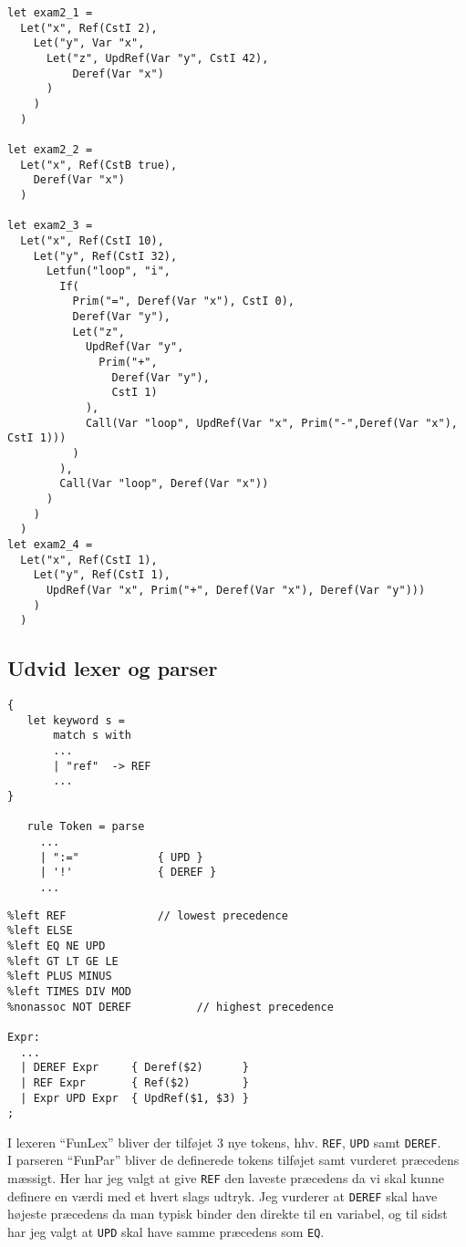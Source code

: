 \documentclass[11pt,a4paper]{article}
\begin{document}
\begin{lstlisting}[style=fsharp]
let exam2_1 = 
  Let("x", Ref(CstI 2),
    Let("y", Var "x",
      Let("z", UpdRef(Var "y", CstI 42),
          Deref(Var "x")
      )
    )
  )

let exam2_2 = 
  Let("x", Ref(CstB true),
    Deref(Var "x")
  )

let exam2_3 = 
  Let("x", Ref(CstI 10),
    Let("y", Ref(CstI 32),
      Letfun("loop", "i",
        If(
          Prim("=", Deref(Var "x"), CstI 0),
          Deref(Var "y"),
          Let("z", 
            UpdRef(Var "y", 
              Prim("+",
                Deref(Var "y"), 
                CstI 1)
            ),
            Call(Var "loop", UpdRef(Var "x", Prim("-",Deref(Var "x"), CstI 1)))
          )
        ),
        Call(Var "loop", Deref(Var "x"))
      )
    )
  )
let exam2_4 = 
  Let("x", Ref(CstI 1),
    Let("y", Ref(CstI 1),
      UpdRef(Var "x", Prim("+", Deref(Var "x"), Deref(Var "y")))
    )
  )
\end{lstlisting}
\subsection{Udvid lexer og parser}
\begin{lstlisting}[style=fsharp]
{
   let keyword s =
       match s with
       ...
       | "ref"  -> REF
       ...
}
   
   rule Token = parse
     ...
     | ":="            { UPD }
     | '!'             { DEREF }
     ...
\end{lstlisting}
\begin{lstlisting}[style=fsharp]
%token REF UPD DEREF
%left REF              // lowest precedence  
%left ELSE
%left EQ NE UPD
%left GT LT GE LE 
%left PLUS MINUS
%left TIMES DIV MOD 
%nonassoc NOT DEREF          // highest precedence

Expr:
  ...
  | DEREF Expr     { Deref($2)      }
  | REF Expr       { Ref($2)        }
  | Expr UPD Expr  { UpdRef($1, $3) }
;
\end{lstlisting}
I lexeren ``FunLex'' bliver der tilføjet 3 nye tokens, hhv. \Verb|REF|, \Verb|UPD| samt \Verb|DEREF|.\\
I parseren ``FunPar'' bliver de definerede tokens tilføjet samt vurderet præcedens mæssigt. Her har jeg valgt at give \Verb|REF| den laveste præcedens da vi skal kunne definere en værdi med et hvert slags udtryk. Jeg vurderer at \Verb|DEREF| skal have højeste præcedens da man typisk binder den direkte til en variabel, og til sidst har jeg valgt at \Verb|UPD| skal have samme præcedens som \Verb|EQ|.
\end{document}
